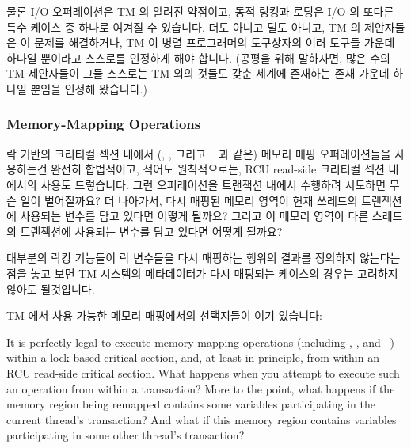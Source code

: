 물론 I/O 오퍼레이션은 TM 의 알려진 약점이고, 동적 링킹과 로딩은 I/O 의 또다른
특수 케이스 중 하나로 여겨질 수 있습니다.
더도 아니고 덜도 아니고, TM 의 제안자들은 이 문제를 해결하거나, TM 이 병렬
프로그래머의 도구상자의 여러 도구들 가운데 하나일 뿐이라고 스스로를 인정하게
해야 합니다.
(공평을 위해 말하자면, 많은 수의 TM 제안자들이 그들 스스로는 TM 외의 것들도
갖춘 세계에 존재하는 존재 가운데 하나일 뿐임을 인정해 왔습니다.)

\subsubsection{Memory-Mapping Operations}
\label{sec:future:Memory-Mapping Operations}

락 기반의 크리티컬 섹션 내에서 (, , 그리고
~\cite{TheOpenGroup1997SUS} 과 같은) 메모리 매핑 오퍼레이션들을
사용하는건 완전히 합법적이고, 적어도 원칙적으로는, RCU read-side 크리티컬 섹션
내에서의 사용도 드렇습니다.
그런 오퍼레이션을 트랜잭션 내에서 수행하려 시도하면 무슨 일이 벌어질까요?
더 나아가서, 다시 매핑된 메모리 영역이 현재 쓰레드의 트랜잭션에 사용되는 변수를
담고 있다면 어떻게 될까요?
그리고 이 메모리 영역이 다른 스레드의 트랜잭션에 사용되는 변수를 담고 있다면
어떻게 될까요?

대부분의 락킹 기능들이 락 변수들을 다시 매핑하는 행위의 결과를 정의하지
않는다는 점을 놓고 보면 TM 시스템의 메타데이터가 다시 매핑되는 케이스의 경우는
고려하지 않아도 될것입니다.

TM 에서 사용 가능한 메모리 매핑에서의 선택지들이 여기 있습니다:
\iffalse

It is perfectly legal to execute memory-mapping operations (including
, , and ~\cite{TheOpenGroup1997SUS})
within a lock-based critical section,
and, at least in principle, from within an RCU read-side critical section.
What happens when you attempt to execute such an operation from within
a transaction?
More to the point, what happens if the memory region being remapped
contains some variables participating in the current thread's transaction?
And what if this memory region contains variables participating in some
other thread's transaction?

